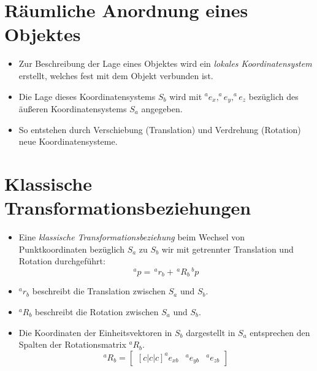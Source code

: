 \documentclass[a4paper, 11pt, accentcolor = tud3b]{tudreport}
\begin{document}
        \section{Räumliche Anordnung eines Objektes} %
            \begin{itemize}
            	\item Zur Beschreibung der Lage eines Objektes wird ein \textit{lokales Koordinatensystem} erstellt, welches fest mit dem Objekt verbunden ist.
            	\item Die Lage dieses Koordinatensystems \( S _ b \) wird mit \( ^ae_x, ^ae_y, ^ae_z \) bezüglich des äußeren Koordinatensystems \( S _ a \) angegeben.
            	\item So entstehen durch Verschiebung (Translation) und Verdrehung (Rotation) neue Koordinatensysteme.
            \end{itemize}

        \section{Klassische Transformationsbeziehungen} %
            \begin{itemize}
            	\item Eine \textit{klassische Transformationsbeziehung} beim Wechsel von Punktkoordinaten bezüglich \( S _ a \) zu \( S _ b \) wir mit getrennter Translation und Rotation durchgeführt:
		            \begin{equation*}
			            ^ap = \,^ar_b + \,^aR_b \,^bp
		            \end{equation*}
		        \item \( ^ar_b \) beschreibt die Translation zwischen \( S _ a \) und \( S _ b \).
		        \item \( ^aR_b \) beschreibt die Rotation zwischen \( S _ a \) und \( S _ b \).
		        \item Die Koordinaten der Einheitsvektoren in \( S _ b \) dargestellt in \( S _ a \) entsprechen den Spalten der Rotationsmatrix \( ^aR_b \).
			        \begin{equation*}
				        ^aR_b =
				        \begin{bmatrix}[c|c|c]
					        ^ae_{xb} & ^ae_{yb} & ^ae_{zb}
				        \end{bmatrix}
			        \end{equation*}
            \end{itemize}
\end{document}
